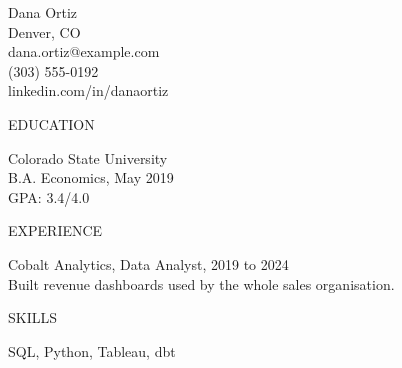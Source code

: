 \documentclass[letterpaper,11pt]{article}
\begin{document}
\noindent Dana Ortiz\\
Denver, CO\\
dana.ortiz@example.com\\
(303) 555-0192\\
linkedin.com/in/danaortiz

\bigskip\noindent EDUCATION

\noindent Colorado State University\\
B.A. Economics, May 2019\\
GPA: 3.4/4.0

\bigskip\noindent EXPERIENCE

\noindent Cobalt Analytics, Data Analyst, 2019 to 2024\\
Built revenue dashboards used by the whole sales organisation.

\bigskip\noindent SKILLS

\noindent SQL, Python, Tableau, dbt
\end{document}
